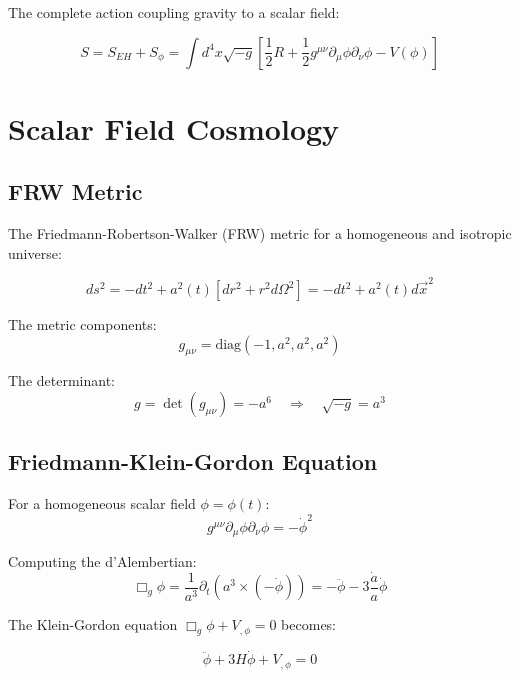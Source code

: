 \documentclass[11pt,a4paper]{article}
\begin{document}
The complete action coupling gravity to a scalar field:

\begin{equation}
\boxed{S = S_{EH} + S_\phi = \int d^4x \sqrt{-g} \left[ \frac{1}{2} R + \frac{1}{2} g^{\mu\nu} \partial_\mu \phi \partial_\nu \phi - V(\phi) \right]}
\end{equation}

\section{Scalar Field Cosmology}

\subsection{FRW Metric}

The Friedmann-Robertson-Walker (FRW) metric for a homogeneous and isotropic universe:

\begin{equation}
ds^2 = -dt^2 + a^2(t) \left[ dr^2 + r^2 d\Omega^2 \right] = -dt^2 + a^2(t) d\vec{x}^2
\end{equation}

The metric components:
\begin{equation}
g_{\mu\nu} = \text{diag}(-1, a^2, a^2, a^2)
\end{equation}

The determinant:
\begin{equation}
g = \det(g_{\mu\nu}) = -a^6 \quad \Rightarrow \quad \sqrt{-g} = a^3
\end{equation}

\subsection{Friedmann-Klein-Gordon Equation}

For a homogeneous scalar field $\phi = \phi(t)$:
\begin{equation}
g^{\mu\nu} \partial_\mu \phi \partial_\nu \phi = -\dot{\phi}^2
\end{equation}

Computing the d'Alembertian:
\begin{equation}
\Box_g \phi = \frac{1}{a^3} \partial_t (a^3 \times (-\dot{\phi})) = -\ddot{\phi} - 3\frac{\dot{a}}{a}\dot{\phi}
\end{equation}

The Klein-Gordon equation $\Box_g \phi + V_{,\phi} = 0$ becomes:

\begin{equation}
\boxed{\ddot{\phi} + 3H\dot{\phi} + V_{,\phi} = 0}
\end{equation}
\end{document}
